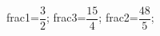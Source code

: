 \documentclass[exercice]{thedocument}%
\begin{document}
%
    \>frac1=$\dfrac{3}2$;%
    \>frac3=$\dfrac{15}4$;%
    \>frac2=$\dfrac{48}{5}$;%
\end{document}

